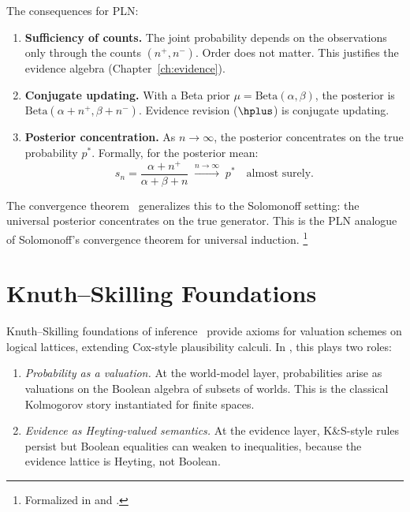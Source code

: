 \documentclass[11pt,openany]{report}
\begin{document}
The consequences for PLN:
\begin{enumerate}
\item \textbf{Sufficiency of counts.}  The joint probability depends
  on the observations only through the counts $(n^+, n^-)$.  Order
  does not matter.  This justifies the evidence algebra
  (Chapter~\ref{ch:evidence}).

\item \textbf{Conjugate updating.}  With a Beta prior
  $\mu = \mathrm{Beta}(\alpha, \beta)$, the posterior is
  $\mathrm{Beta}(\alpha + n^+, \beta + n^-)$.  Evidence revision
  ($\hplus$) is conjugate updating.

\item \textbf{Posterior concentration.}  As $n \to \infty$, the
  posterior concentrates on the true probability $p^*$.
  Formally, for the posterior mean:
  \[
    s_n = \frac{\alpha + n^+}{\alpha + \beta + n} \;\xrightarrow{n \to \infty}\; p^*
    \quad \text{almost surely.}
  \]
\end{enumerate}

The \nuPLN{} convergence theorem~\cite{nuPLN2026} generalizes this
to the Solomonoff setting: the universal posterior concentrates on the
true generator.  This is the PLN analogue of Solomonoff's convergence
theorem for universal induction.%
\footnote{Formalized in  and
  .}

\section{Knuth--Skilling Foundations}
\label{sec:knuth-skilling}

Knuth--Skilling foundations of inference~\cite{KnuthSkilling2012} provide
axioms for valuation schemes on logical lattices, extending Cox-style
plausibility calculi.  In \xiPLN{}, this plays two roles:

\begin{enumerate}
\item \emph{Probability as a valuation.}  At the world-model layer,
  probabilities arise as valuations on the Boolean algebra of subsets of
  worlds.  This is the classical Kolmogorov story instantiated for finite
  spaces.

\item \emph{Evidence as Heyting-valued semantics.}  At the evidence
  layer, K\&S-style rules persist but Boolean equalities can weaken to
  inequalities, because the evidence lattice is Heyting, not Boolean.
\end{enumerate}
\end{document}
